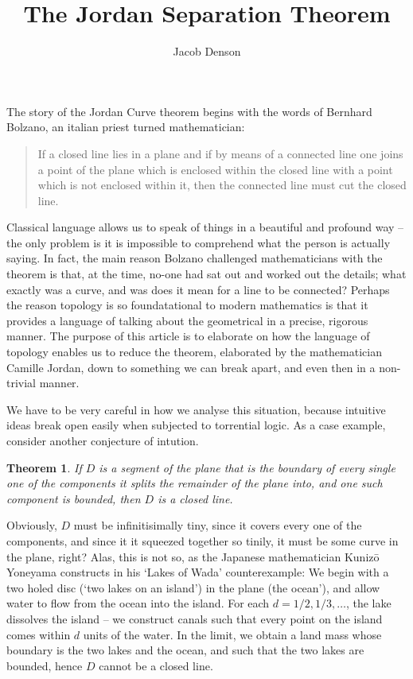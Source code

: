 \documentclass{article}
\title{The Jordan Separation Theorem}
\author{Jacob Denson}
\newtheorem{theorem}{Theorem}
\begin{document}
\maketitle

The story of the Jordan Curve theorem begins with the words of Bernhard Bolzano, an italian priest turned mathematician:
%
\begin{quote}
    If a closed line lies in a plane and if by means of a connected line one joins a point of the plane which is enclosed within the closed line with a point which is not enclosed within it, then the connected line must cut the closed line.
\end{quote}
%
Classical language allows us to speak of things in a beautiful and profound way -- the only problem is it is impossible to comprehend what the person is actually saying. In fact, the main reason Bolzano challenged mathematicians with the theorem is that, at the time, no-one had sat out and worked out the details; what exactly was a curve, and was does it mean for a line to be connected? Perhaps the reason topology is so foundatational to modern mathematics is that it provides a language of talking about the geometrical in a precise, rigorous manner. The purpose of this article is to elaborate on how the language of topology enables us to reduce the theorem, elaborated by the mathematician Camille Jordan, down to something we can break apart, and even then in a non-trivial manner.

We have to be very careful in how we analyse this situation, because intuitive ideas break open easily when subjected to torrential logic. As a case example, consider another conjecture of intution.
%
\begin{theorem}
    If $D$ is a segment of the plane that is the boundary of every single one of the components it splits the remainder of the plane into, and one such component is bounded, then $D$ is a closed line.
\end{theorem}
%
Obviously, $D$ must be infinitisimally tiny, since it covers every one of the components, and since it it squeezed together so tinily, it must be some curve in the plane, right? Alas, this is not so, as the Japanese mathematician Kunizō Yoneyama constructs in his `Lakes of Wada' counterexample: We begin with a two holed disc (`two lakes on an island') in the plane (the ocean'), and allow water to flow from the ocean into the island. For each $d = 1/2, 1/3, \dots$, the lake dissolves the island -- we construct canals such that every point on the island comes within $d$ units of the water. In the limit, we obtain a land mass whose boundary is the two lakes and the ocean, and such that the two lakes are bounded, hence $D$ cannot be a closed line.
\end{document}
